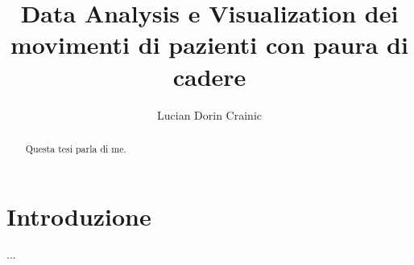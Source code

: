 \documentclass[binding=0.6cm]{sapthesis}
\title{Data Analysis e Visualization dei movimenti di pazienti con paura di cadere}
\author{Lucian Dorin Crainic}
\begin{document}
\frontmatter
\maketitle
\dedication{Dedicato a\\ Mamma e Papà}
\begin{abstract}
Questa tesi parla di me.
\end{abstract}
\tableofcontents
\mainmatter
\chapter{Introduzione}
...
\backmatter
\cleardoublepage
{} %
\end{document}
